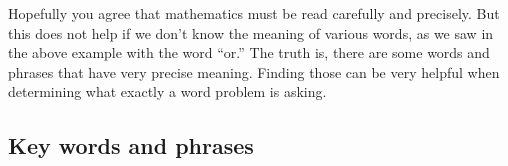 Hopefully you agree that mathematics must be read carefully and precisely.  But this does not help if we don't know the meaning of various words, as we saw in the above example with the word ``or.''  The truth is, there are some words and phrases that have very precise meaning.  Finding those can be very helpful when determining what exactly a word problem is asking.

\subsection{Key words and phrases}

